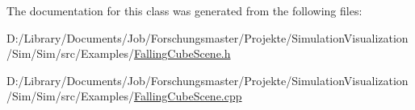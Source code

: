 The documentation for this class was generated from the following files\+:\begin{DoxyCompactItemize}
\item 
D\+:/\+Library/\+Documents/\+Job/\+Forschungsmaster/\+Projekte/\+Simulation\+Visualization/\+Sim/\+Sim/src/\+Examples/\mbox{\hyperlink{_falling_cube_scene_8h}{Falling\+Cube\+Scene.\+h}}\item 
D\+:/\+Library/\+Documents/\+Job/\+Forschungsmaster/\+Projekte/\+Simulation\+Visualization/\+Sim/\+Sim/src/\+Examples/\mbox{\hyperlink{_falling_cube_scene_8cpp}{Falling\+Cube\+Scene.\+cpp}}\end{DoxyCompactItemize}
